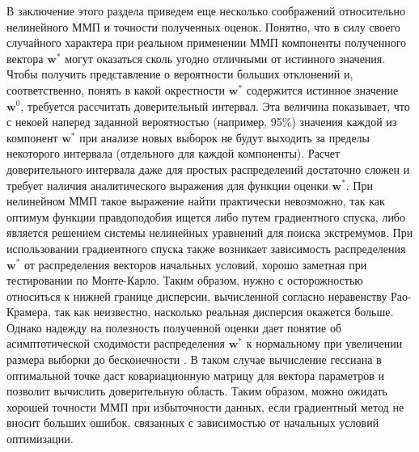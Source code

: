 \documentclass[14pt, a4paper]{extreport}
\numberwithin{equation}{section}
\begin{document}
В заключение этого раздела приведем еще несколько соображений относительно нелинейного ММП и точности полученных оценок. Понятно, что в силу своего случайного характера при реальном применении ММП компоненты полученного вектора $\mathbf{w}^*$ могут оказаться сколь угодно отличными от истинного значения. Чтобы получить представление о вероятности больших отклонений и, соответственно, понять в какой окрестности  $\mathbf{w}^*$ содержится истинное значение $\mathbf{w}^0$, требуется рассчитать доверительный интервал. Эта величина показывает, что с некоей наперед заданной вероятностью (например, 95\%) значения каждой из компонент $\mathbf{w}^*$ при анализе новых выборок не будут выходить за пределы некоторого интервала (отдельного для каждой компоненты). Расчет доверительного интервала даже для простых распределений достаточно сложен и требует наличия аналитического выражения для функции оценки $\mathbf{w}^*$. При нелинейном ММП такое выражение найти практически невозможно, так как оптимум функции правдоподобия ищется либо путем градиентного спуска, либо является решением системы нелинейных уравнений для поиска экстремумов. При использовании градиентного спуска также возникает зависимость распределения $\mathbf{w}^*$ от распределения векторов начальных условий, хорошо заметная при тестировании по Монте-Карло. Таким образом, нужно с осторожностью относиться к нижней границе дисперсии, вычисленной согласно неравенству Рао-Крамера, так как неизвестно, насколько реальная дисперсия окажется больше. Однако надежду на полезность полученной оценки дает понятие об асимптотической сходимости распределения  $\mathbf{w}^*$ к нормальному при увеличении размера выборки до бесконечности \cite{jennrich1969, anastasiou2017}. В таком случае вычисление гессиана в оптимальной точке даст ковариационную матрицу для вектора параметров и позволит вычислить доверительную область. Таким образом, можно ожидать хорошей точности ММП при избыточности данных, если градиентный метод не вносит больших ошибок, связанных с зависимостью от начальных условий оптимизации.
 

\renewcommand\bibname{Список литературы}


\end{document}
